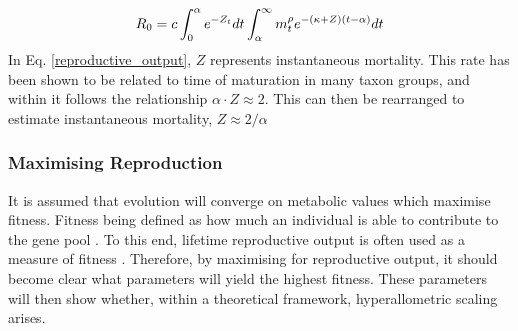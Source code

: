 \documentclass[a4paper, 11pt, hidelinks]{article} %
\begin{document}
	\begin{equation}
		\label{reproductive_output}
		R_0 = c\int_0^\alpha e^{-Z_t} dt  \int_\alpha^\infty m_t^\rho e^{-(\kappa + Z)(t - \alpha)}dt\\
	\end{equation} 
	In Eq. \ref{reproductive_output}, $ Z $ represents instantaneous mortality.  This rate has been shown to be related to time of maturation in many taxon groups, and within it follows the relationship $ \alpha \cdot Z \approx  2$.  This can then be rearranged to estimate instantaneous mortality, $ Z \approx 2/\alpha  $
	
	\subsubsection{Maximising Reproduction}
	It is assumed that evolution will converge on metabolic values which maximise fitness. 
	Fitness being defined as how much an individual is able to contribute to the gene pool \parencite{Speakman2008, Stearns2000}.  %
	To this end, lifetime reproductive output is often used as a measure of fitness \parencite{Charnov1991, Audzijonyte2018, Speakman2008, Stearns2000, Charnov2001, Tsoukali2016, Brown1993, Charnov2007}.  Therefore, by maximising for reproductive output, it should become clear what parameters will yield the highest fitness.  These parameters will then show whether, within a theoretical framework, hyperallometric scaling arises.
	
\end{document}
